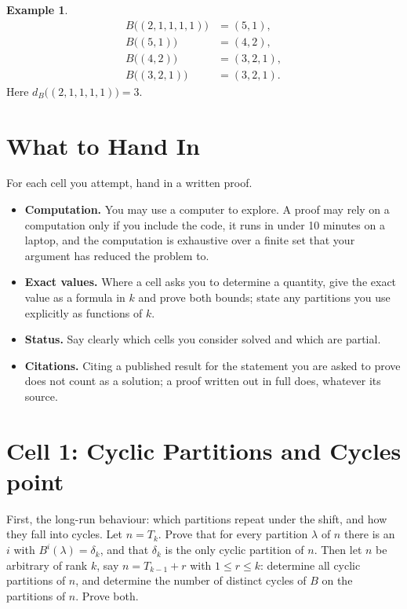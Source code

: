 \documentclass[11pt]{article}
\theoremstyle{definition}
\newtheorem*{example}{Example}
\newcommand{\dB}{d_B}
\newcommand{\cell}[3]{%
  \section*{Cell #1: #2\hfill{\normalsize\mdseries #3}}}
\begin{document}
\begin{example}
\begin{align*}
  B\bigl((2,1,1,1,1)\bigr) &= (5,1), \\
  B\bigl((5,1)\bigr)       &= (4,2), \\
  B\bigl((4,2)\bigr)       &= (3,2,1), \\
  B\bigl((3,2,1)\bigr)     &= (3,2,1).
\end{align*}
Here $\dB\bigl((2,1,1,1,1)\bigr) = 3$.
\end{example}

\section*{What to Hand In}

For each cell you attempt, hand in a written proof.

\begin{itemize}[leftmargin=*]
  \item \textbf{Computation.}
    You may use a computer to explore. A proof may rely on a
    computation only if you include the code, it runs in under
    10 minutes on a laptop, and the computation is exhaustive over a
    finite set that your argument has reduced the problem to.
  \item \textbf{Exact values.}
    Where a cell asks you to determine a quantity, give the exact
    value as a formula in $k$ and prove both bounds; state any
    partitions you use explicitly as functions of $k$.
  \item \textbf{Status.}
    Say clearly which cells you consider solved and which are
    partial.
  \item \textbf{Citations.}
    Citing a published result for the statement you are asked to
    prove does not count as a solution; a proof written out in full
    does, whatever its source.
\end{itemize}

\cell{1}{Cyclic Partitions and Cycles}{1 point}

First, the long-run behaviour: which partitions repeat under the
shift, and how they fall into cycles. Let $n = T_k$. Prove that for
every partition $\lambda$ of $n$ there is an $i$ with
$B^i(\lambda) = \delta_k$, and that $\delta_k$ is the only cyclic
partition of $n$. Then let $n$ be arbitrary of rank $k$, say
$n = T_{k-1} + r$ with $1 \leq r \leq k$: determine all cyclic
partitions of $n$, and determine the number of distinct cycles of $B$
on the partitions of $n$. Prove both.
\end{document}
